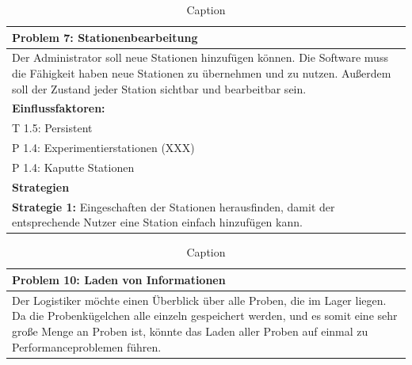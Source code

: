 \documentclass[enabledeprecatedfontcommands,fontsize=12pt,paper=a4,twoside]{scrartcl}
\begin{document}
\begin{table}[]

    \centering
    \begin{tabular}{|p{15cm}|}
    \hline
          \textbf{Problem 7:} Stationenbearbeitung
          \\ \hline
          Der Administrator soll neue Stationen hinzufügen können. Die Software muss die Fähigkeit haben neue Stationen zu übernehmen und zu nutzen. Außerdem soll der Zustand jeder Station sichtbar und bearbeitbar sein.
          \\ \hline
          \textbf{Einflussfaktoren: } \\
          T 1.5: Persistent \\
          P 1.4: Experimentierstationen (XXX)\\
          P 1.4: Kaputte Stationen\\
          \hline
          \textbf{Strategien} \\ \hline
          \textbf{Strategie 1:} Eingeschaften der Stationen herausfinden, damit der entsprechende Nutzer eine Station einfach hinzufügen kann.
          \\ \hline
    \end{tabular}
    \caption{Caption}
    \label{tab:my_label}
\end{table}


\begin{table}[]
    \centering
    \begin{tabular}{|p{15cm}|}
    \hline
          \textbf{Problem 10:} Laden von Informationen
          \\ \hline

          Der Logistiker möchte einen Überblick über alle Proben, die im Lager liegen. Da die Probenkügelchen alle einzeln gespeichert werden, und es somit eine sehr große Menge an Proben ist, könnte das Laden aller Proben auf einmal zu Performanceproblemen führen.

    \end{tabular}
    \caption{Caption}
    \label{tab:my_label}
\end{table}
\end{document}

